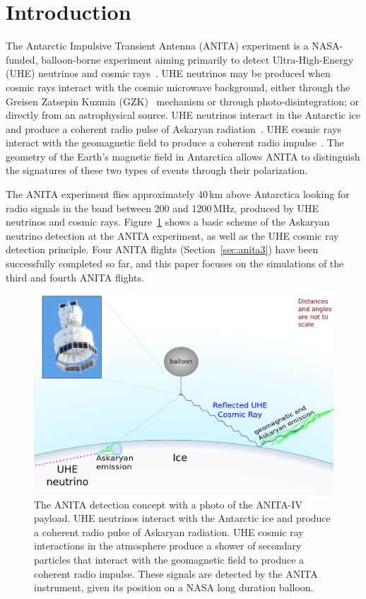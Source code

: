 \section{Introduction}
The Antarctic Impulsive Transient Antenna (ANITA) experiment is a NASA-funded, balloon-borne experiment aiming primarily to detect Ultra-High-Energy (UHE) neutrinos and cosmic rays~\cite{ANITA1detector,ANITA1paper,ANITA2paper,ANITA2erratum}.
UHE neutrinos may be produced when cosmic rays interact with the
cosmic microwave background, either through the Greisen Zatsepin
Kuzmin (GZK)~\cite{greisen1966end,zatsepin1966gt} mechanism or through photo-disintegration; or directly from an astrophysical source.
UHE neutrinos interact in the Antarctic ice and produce a coherent radio pulse of Askaryan radiation~\cite{askaryan}. UHE cosmic rays interact with the geomagnetic field to produce a coherent radio impulse~\cite{ANITA1UHECR}. The geometry of the Earth's magnetic field in Antarctica allows ANITA to distinguish the signatures of these two types of events through their polarization.

The ANITA experiment flies approximately 40\,km above Antarctica looking for radio signals in the band between 200 and 1200\,MHz, produced by UHE neutrinos and cosmic rays.
Figure~\ref{fig:intro_ANITAconcept} shows a basic scheme of the
Askaryan neutrino detection at the ANITA experiment, as well as the UHE cosmic ray detection principle.
Four ANITA flights (Section~\ref{sec:anita3}) have been successfully completed so far, and this paper focuses on the simulations of the third and fourth ANITA flights.

\begin{figure}[!h]\centering
  \includegraphics[width=.8\linewidth]{./Figs/ANITA_scheme_icemcpaper.png}
  \caption{The ANITA detection concept with a photo of the ANITA-IV payload. UHE neutrinos interact with the Antarctic ice and produce a coherent radio pulse of Askaryan radiation. UHE cosmic ray interactions in the atmosphere produce a shower of secondary particles that interact with the geomagnetic field to produce a coherent radio impulse. These signals are detected by the ANITA instrument, given its position on a NASA long duration balloon. %
  }
  \label{fig:intro_ANITAconcept}
\end{figure}



